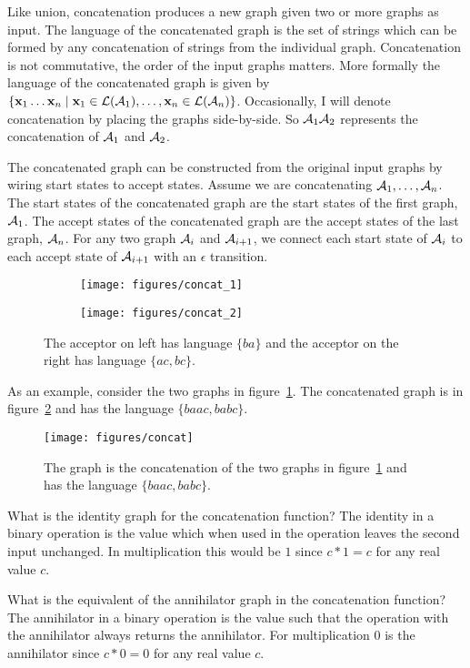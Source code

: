 Like union, concatenation produces a new graph given two or more graphs as
input. The language of the concatenated graph is the set of strings which can
be formed by any concatenation of strings from the individual graph.
Concatenation is not commutative, the order of the input graphs matters. More
formally the language of the concatenated graph is given by $\{{\bf x}_1 \ldots
{\bf x}_n \mid {\bf x}_1 \in \mathcal{L}(\mathcal{A}_1), \ldots, {\bf x}_n \in \mathcal{L}(\mathcal{A}_n)\}$. Occasionally, I
will denote concatenation by placing the graphs side-by-side. So $\mathcal{A}_1 \mathcal{A}_2$
represents the concatenation of $\mathcal{A}_1$ and $\mathcal{A}_2$.

The concatenated graph can be constructed from the original input graphs by
wiring start states to accept states. Assume we are concatenating $\mathcal{A}_1,
\ldots, \mathcal{A}_n$. The start states of the concatenated graph are the start
states of the first graph, $\mathcal{A}_1$. The accept states of the concatenated
graph are the accept states of the last graph, $\mathcal{A}_n$. For any two graph
$\mathcal{A}_i$ and $\mathcal{A}_{i+1}$, we connect each start state of $\mathcal{A}_i$ to each accept
state of $\mathcal{A}_{i+1}$ with an $\epsilon$ transition.

\begin{figure}
    \centering
    \begin{subfigure}[b]{0.48\textwidth}
        \centering
        \texttt{[image: figures/concat\_1]}
    \end{subfigure}
    \begin{subfigure}[b]{0.48\textwidth}
        \centering
        \texttt{[image: figures/concat\_2]}
    \end{subfigure}
    \caption{The acceptor on left has language $\{ba\}$ and the acceptor on the
    right has language $\{ac, bc\}$.}
    \label{fig:concat_inputs}
\end{figure}

As an example, consider the two graphs in figure~\ref{fig:concat_inputs}. The
concatenated graph is in figure~\ref{fig:concat} and has the language $\{baac,
babc\}$.

\begin{figure}
    \centering
    \texttt{[image: figures/concat]}
    \caption{The graph is the concatenation of the two graphs in
    figure~\ref{fig:concat_inputs} and has the language $\{baac, babc\}$.}
    \label{fig:concat}
\end{figure}

\begin{example}
What is the identity graph for the concatenation function? The identity in a
binary operation is the value which when used in the operation leaves the second
input unchanged. In multiplication this would be $1$ since $c * 1 = c$ for any
real value $c$.

What is the equivalent of the annihilator graph in the concatenation function?
The annihilator in a binary operation is the value such that the operation with
the annihilator always returns the annihilator. For multiplication $0$ is the
annihilator since $c *0 = 0$ for any real value $c$.
\end{example}

